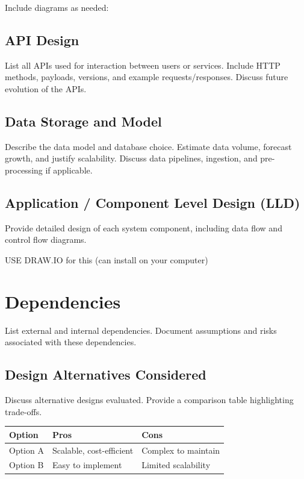 \documentclass[12pt,a4paper]{article}
\begin{document}
Include diagrams as needed:
\begin{center}
\end{center}

\subsection{API Design}
List all APIs used for interaction between users or services.  
Include HTTP methods, payloads, versions, and example requests/responses.  
Discuss future evolution of the APIs.

\subsection{Data Storage and Model}
Describe the data model and database choice.  
Estimate data volume, forecast growth, and justify scalability.  
Discuss data pipelines, ingestion, and pre-processing if applicable.

\subsection{Application / Component Level Design (LLD)}
Provide detailed design of each system component, including data flow and control flow diagrams.

USE DRAW.IO for this (can install on your computer)

\newpage
\section{Dependencies}
List external and internal dependencies.  
Document assumptions and risks associated with these dependencies.
\subsection{Design Alternatives Considered}
Discuss alternative designs evaluated.  
Provide a comparison table highlighting trade-offs.

\begin{longtable}{@{}p{3cm}p{5cm}p{5cm}@{}}
\toprule
\textbf{Option} & \textbf{Pros} & \textbf{Cons} \\ \midrule
Option A & Scalable, cost-efficient & Complex to maintain \\
Option B & Easy to implement & Limited scalability \\ \bottomrule
\end{longtable}
\end{document}
